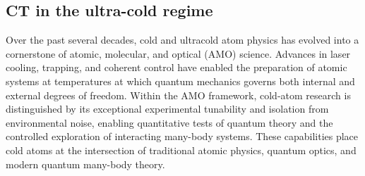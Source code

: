 




\subsection{CT in the ultra-cold regime}
\noindent
Over the past several decades, cold and ultracold atom physics has evolved into a cornerstone of atomic, molecular, and optical (AMO) science. Advances in laser cooling, trapping, and coherent control have enabled the preparation of atomic systems at temperatures at which quantum mechanics governs both internal and external degrees of freedom. Within the AMO framework, cold-atom research is distinguished by its exceptional experimental tunability and isolation from environmental noise, enabling quantitative tests of quantum theory and the controlled exploration of interacting many-body systems. These capabilities place cold atoms at the intersection of traditional atomic physics, quantum optics, and modern quantum many-body theory.

